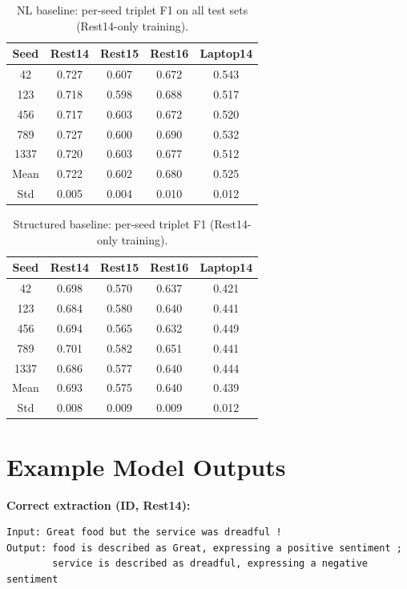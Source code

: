 \documentclass[12pt,a4paper]{report}
\begin{document}
\begin{table}[H]
\centering
\caption{NL baseline: per-seed triplet F1 on all test sets (Rest14-only training).}
\small
\begin{tabular}{@{}ccccc@{}}
\toprule
\textbf{Seed} & \textbf{Rest14} & \textbf{Rest15} & \textbf{Rest16} & \textbf{Laptop14} \\
\midrule
42 & 0.727 & 0.607 & 0.672 & 0.543 \\
123 & 0.718 & 0.598 & 0.688 & 0.517 \\
456 & 0.717 & 0.603 & 0.672 & 0.520 \\
789 & 0.727 & 0.600 & 0.690 & 0.532 \\
1337 & 0.720 & 0.603 & 0.677 & 0.512 \\
\midrule
Mean & 0.722 & 0.602 & 0.680 & 0.525 \\
Std & 0.005 & 0.004 & 0.010 & 0.012 \\
\bottomrule
\end{tabular}
\end{table}

\begin{table}[H]
\centering
\caption{Structured baseline: per-seed triplet F1 (Rest14-only training).}
\small
\begin{tabular}{@{}ccccc@{}}
\toprule
\textbf{Seed} & \textbf{Rest14} & \textbf{Rest15} & \textbf{Rest16} & \textbf{Laptop14} \\
\midrule
42 & 0.698 & 0.570 & 0.637 & 0.421 \\
123 & 0.684 & 0.580 & 0.640 & 0.441 \\
456 & 0.694 & 0.565 & 0.632 & 0.449 \\
789 & 0.701 & 0.582 & 0.651 & 0.441 \\
1337 & 0.686 & 0.577 & 0.640 & 0.444 \\
\midrule
Mean & 0.693 & 0.575 & 0.640 & 0.439 \\
Std & 0.008 & 0.009 & 0.009 & 0.012 \\
\bottomrule
\end{tabular}
\end{table}

\section{Example Model Outputs}

\textbf{Correct extraction (ID, Rest14):}
\begin{lstlisting}
Input: Great food but the service was dreadful !
Output: food is described as Great, expressing a positive sentiment ;
        service is described as dreadful, expressing a negative sentiment
\end{lstlisting}
\end{document}
